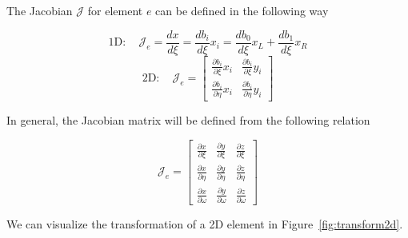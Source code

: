\documentclass[11pt]{style/memo}
\begin{document}
The Jacobian $\mathcal{J}$ for element $e$ can be defined in the following way

\begin{equation*}
    \mathrm{1D:} \quad \mathcal{J}_e = \frac{dx}{d\xi} = \frac{db_i}{d\xi}x_i = \frac{db_0}{d\xi}x_L + \frac{db_1}{d\xi}x_R
\end{equation*}
\begin{equation*}
    \mathrm{2D:} \quad \mathcal{J}_e = \begin{bmatrix}
        \frac{\partial b_i}{\partial\xi}x_i & \frac{\partial b_i}{\partial\xi}y_i \\
        \frac{\partial b_i}{\partial\eta}x_i & \frac{\partial b_i}{\partial\eta}y_i
    \end{bmatrix}
\end{equation*}

In general, the Jacobian matrix will be defined from the following relation

\begin{equation*}
    \mathcal{J}_e = \begin{bmatrix}
        \frac{\partial x}{\partial\xi} & \frac{\partial y}{\partial\xi} & \frac{\partial z}{\partial\xi} \\
        \frac{\partial x}{\partial\eta} & \frac{\partial y}{\partial\eta} & \frac{\partial z}{\partial\eta} \\
        \frac{\partial x}{\partial\omega} & \frac{\partial y}{\partial\omega} & \frac{\partial z}{\partial\omega}
    \end{bmatrix}
\end{equation*}

We can visualize the transformation of a 2D element in Figure~\ref{fig:transform2d}.
\end{document}
